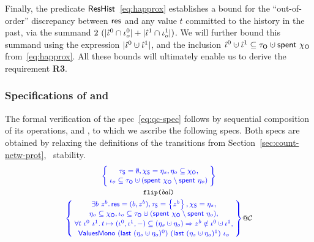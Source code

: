 Finally, the predicate $\mathsf{ResHist}$~\eqref{eq:happrox} establishes a
bound for the ``out-of-order'' discrepancy between $\mathsf{res}$ and any
value $t$ committed to the history in the past, via the summand
$2\ (|\hat{\iota}^0 \cap \iota_o^0| + |\hat{\iota}^1 \cap \iota_o^1|)$. We will further
bound this summand using the expression $|\iknh^0 \hunion \iknh^1|$,
and the inclusion $\iknh^0 \hunion \iknh^1 \subseteq \tkno \hunion
\Tomb~\histo$ from~\eqref{eq:happrox}. All these bounds will
ultimately enable us to derive the requirement \textbf{R3}.
%

\subsubsection{Specifications of {} and
  {}}
\label{sec:qacts}

The formal verification of the spec~\eqref{eq:qc-spec} follows by
sequential composition of its operations,  and
, to which we ascribe the following specs.
%
Both specs are obtained by relaxing the definitions of the transitions
from Section~\ref{sec:count-netw-prot}, \wrt~stability.
%
%
\[
%
{\small
\begin{array}{c}
  \spec{\!\!
  \begin{array}{c}
    \tkns = \emptyset,
    \hists = \gists,
    \gisto \subseteq \histo,\\[2pt]
    \ikno  \subseteq \tkno \hunion (\Tomb~\histo \setminus \Tomb~\gisto)
  \end{array}
  \!\!}
  \\\\[-6pt]
  \texttt{flip(}\bal\texttt{)}
  \\[3pt]
  \spec{\!\!
  \begin{array}{c}
    \exists b~z^b \ldot \res = (b, z^b)\aand
    \tkns = \set{z^b}\aand \hists = \gists \aand   \\[2pt]
    \gisto \subseteq \histo, \ikno \subseteq \tkno \hunion (\Tomb~\histo \setminus \Tomb~\gisto),\\[2pt]    
    \forall t~\ikn^0~\ikn^1 \ldot
    t \hpts (\ikn^0, \ikn^1, -) \subseteq (\gists \hunion \gisto) \Rightarrow z^b \notin \ikn^0 \hunion \ikn^1,
    \\[2pt]     
    \bapprox~(\last~(\gists \hunion \gisto)^0)~(\last~(\gists \hunion \gisto)^1)~\ikno 
  \end{array}
  \!\!}@\ccon
%
\end{array}
}
\]

